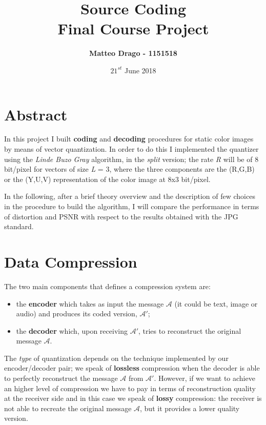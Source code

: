 \documentclass{report}
\newcommand{\hmwkTitle}{Final Course Project} %
\newcommand{\hmwkClass}{Source Coding} %
\newcommand{\hmwkAuthorName}{Matteo Drago - 1151518} %
\begin{document}
\title{
\vspace{2in}
\textmd{\textbf{\hmwkClass \\ \hmwkTitle}}\\
\vspace{3in}
}
\author{\textbf{\hmwkAuthorName}}
\date{$21^{st}$ June 2018} %


\maketitle
{} %
\setcounter{page}{1}

\clearpage 

\section{Abstract}
In this project I built \textbf{coding} and \textbf{decoding} procedures for static color images by means of vector quantization. In order to do this I implemented the quantizer using the \textit{Linde Buzo Gray} algorithm, in the \textit{split} version; the rate \textit{R} will be of 8 bit/pixel for vectors of size \textit{L} = 3, where the three components are the (R,G,B) or the (Y,U,V) representation of the color image at 8x3 bit/pixel.

In the following, after a brief theory overview and the description of few choices in the procedure to build the algorithm, I will compare the performance in terms of distortion and PSNR with respect to the results obtained with the JPG standard.

\section{Data Compression}
The two main components that defines a compression system are:
\begin{itemize}
	\item the \textbf{encoder} which takes as input the message $\mathcal{A}$ (it could be text, image or audio) and produces its coded version, $\mathcal{A}'$;
	\item the \textbf{decoder} which, upon receiving $\mathcal{A}'$, tries to reconstruct the original message $\mathcal{A}$.
\end{itemize}   
The \textit{type} of quantization depends on the technique implemented by our encoder/decoder pair; we speak of \textbf{lossless} compression when the decoder is able to perfectly reconstruct the message $\mathcal{A}$ from $\mathcal{A}'$. However, if we want to achieve an higher level of compression we have to pay in terms of reconstruction quality at the receiver side and in this case we speak of \textbf{lossy} compression: the receiver is not able to recreate the original message $\mathcal{A}$, but it provides a lower quality version.
\end{document}
